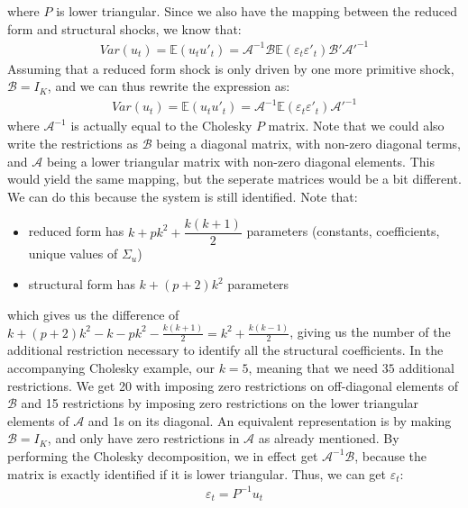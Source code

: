 \documentclass[a4paper, 12pt]{article}
\begin{document}
where $P$ is lower triangular. Since we also have the mapping between the reduced form and structural shocks, we know that:
\begin{equation}
\begin{aligned}
Var(u_t)=\mathbb{E}(u_tu'_t)=\mathcal{A}^{-1}\mathcal{B}\mathbb{E}(\varepsilon_t\varepsilon'_t)\mathcal{B}'\mathcal{A}'^{-1} \nonumber
\end{aligned}
\end{equation}
Assuming that a reduced form shock is only driven by one more primitive shock, $\mathcal{B}=I_K$, and we can thus rewrite the expression as:
\begin{equation}
\begin{aligned}
Var(u_t)=\mathbb{E}(u_tu'_t)=\mathcal{A}^{-1}\mathbb{E}(\varepsilon_t\varepsilon'_t)\mathcal{A}'^{-1} 
\end{aligned}
\end{equation}
where $\mathcal{A}^{-1}$ is actually equal to the Cholesky $P$ matrix. Note that we could also write the restrictions as $\mathcal{B}$ being a diagonal matrix, with non-zero diagonal terms, and $\mathcal{A}$ being a lower triangular matrix with non-zero diagonal elements. 
This would yield the same mapping, but the seperate matrices would be a bit different. We can do this because the system is still identified. Note that:
\begin{itemize}
\item reduced form has $k+pk^2+\dfrac{k(k+1)}{2}$ parameters (constants, coefficients, unique values of $\Sigma_u$)
\item structural form has $k+(p+2)k^2$ parameters
\end{itemize}
which gives us the difference of $k+(p+2)k^2-k-pk^2-\frac{k(k+1)}{2}=k^2+\frac{k(k-1)}{2}$, giving us the number of the additional restriction necessary to identify all the structural coefficients. In the accompanying Cholesky example, our $k=5$, meaning that we need $35$ additional restrictions.
We get 20 with imposing zero restrictions on off-diagonal elements of $\mathcal{B}$ and 15 restrictions by imposing zero restrictions on the lower triangular elements of $\mathcal{A}$ and 1s on its diagonal. An equivalent representation is by making $\mathcal{B}=I_K$, and only have zero restrictions in $\mathcal{A}$ as already mentioned. 
By performing the Cholesky decomposition, we in effect get $\mathcal{A}^{-1}\mathcal{B}$, because the matrix is exactly identified if it is lower triangular. Thus, we can get $\varepsilon_t$:
\begin{equation}
\begin{aligned}
\varepsilon_t=P^{-1}u_t \nonumber
\end{aligned}
\end{equation}
\end{document}
